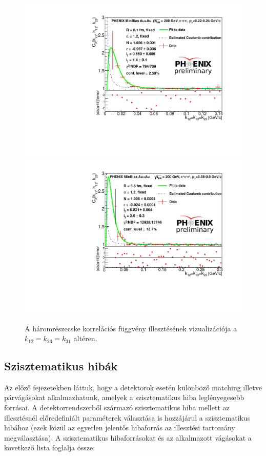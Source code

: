 \documentclass[11pt,a4paper]{article}
\numberwithin{equation}{subsection}
\numberwithin{figure}{section}
\begin{document}
\begin{figure}[H]
\centering
\includegraphics[scale=0.6]{pic/res/diag_lowpt.pdf}
\centering
\includegraphics[scale=0.6]{pic/res/diag_highpt.pdf}
\caption{A háromrészecske korrelációs függvény illesztésének vizualizációja a $k_{12}=k_{23}=k_{31}$ altéren.}
\label{fig:fit}
\end{figure}



\subsection{Szisztematikus hibák}

Az előző fejezetekben láttuk, hogy a detektorok esetén különböző matching illetve párvágásokat alkalmazhatunk, amelyek a szisztematikus hiba leglényegesebb forrásai. A detektorrendszerből származó szisztematikus hiba mellett az illesztésnél előredefiniált paraméterek választása is hozzájárul a szisztematikus hibához (ezek közül az egyetlen jelentős hibaforrás az illesztési tartomány megválasztása). A szisztematikus hibaforrásokat és az alkalmazott vágásokat a következő lista foglalja össze:
\end{document}

